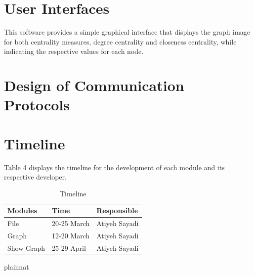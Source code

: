 \documentclass[12pt, titlepage]{article}
\begin{document}
\section{User Interfaces}

This software provides a simple graphical interface that displays the graph image for both centrality measures, degree centrality and closeness centrality, while indicating the respective values for each node.

\section{Design of Communication Protocols}

\section{Timeline}


Table 4 displays the timeline for the development of each module and its respective developer.

\begin{table}[H]
\centering
\begin{tabular}{p{} p{}  p{}}
\toprule
 \textbf{Modules} & \textbf{Time} & \textbf{Responsible} \\
\midrule
File& 20-25 March& Atiyeh Sayadi\\
Graph & 12-20 March& Atiyeh Sayadi\\
Show Graph & 25-29 April& Atiyeh Sayadi\\
\bottomrule
\end{tabular}
\caption{Timeline}
\end{table}

 {plainnat}


\newpage{}
\end{document}
